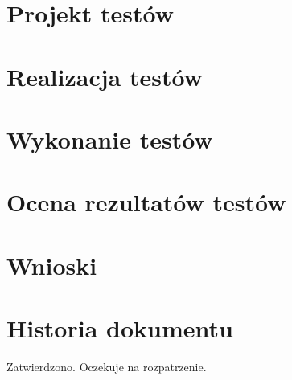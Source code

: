 \documentclass[10pt]{dokument-tiwo}
\begin{document}
\section{Projekt testów}


\section{Realizacja testów}


\section{Wykonanie testów}


\section{Ocena rezultatów testów}


\section{Wnioski}


\newpage
\section*{Historia dokumentu}
\begin{versions}
        Zatwierdzono.
        Oczekuje na rozpatrzenie.
\end{versions}
\end{document}

